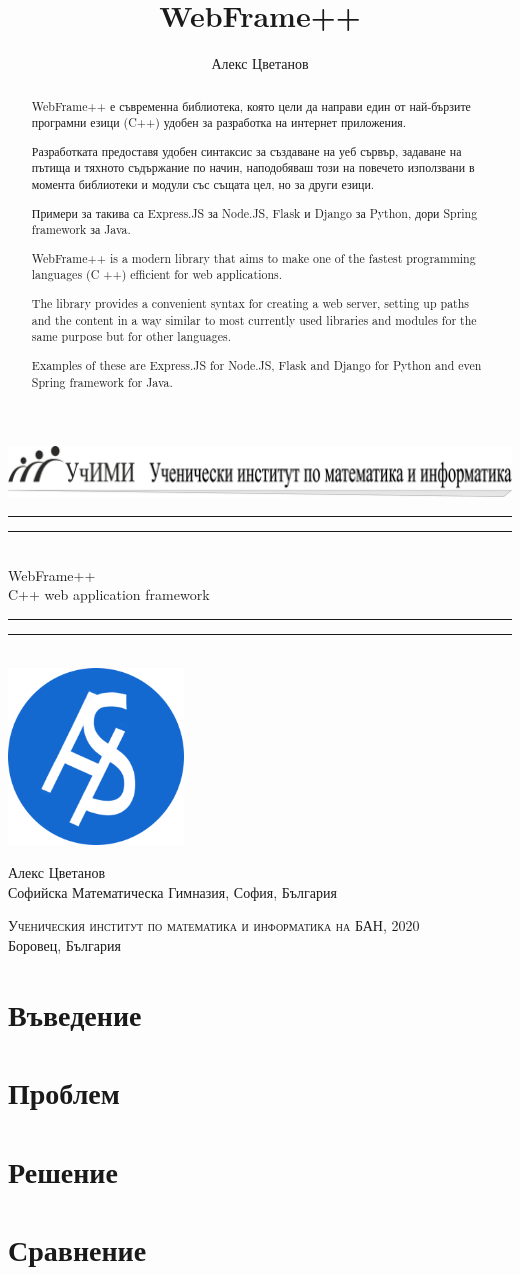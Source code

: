 \documentclass[a4paper,12pt]{article}
\title{WebFrame++}
\author{Алекс Цветанов}
\newcommand{\titleGP}{\begingroup
	\centering
		\includegraphics[width=\textwidth]{images/logo.png}
    \\\vspace{0.1cm}
	\rule{\textwidth}{1.6pt}\vspace{-\baselineskip}\vspace{2pt}
	\rule{\textwidth}{0.4pt}\\[\baselineskip]
	
	{\LARGE WebFrame++ \\ \small{C++ web application framework}}\\[0.2\baselineskip]
	
	\rule{\textwidth}{0.4pt}\vspace{-\baselineskip}\vspace{3.2pt}
	\rule{\textwidth}{1.6pt}\\[\baselineskip]
    \includegraphics[width=0.35\textwidth]{images/webpp-logo.png}

	\vspace{20pt}
	{
	{\LARGE Алекс Цветанов}\\
    {\normalsize Софийска Математическа Гимназия, София, България}
	\par}
	
	\vspace{2\baselineskip}
	
	\vfill
	
	{\scshape Ученическия институт по математика и информатика на БАН, 2020} \\[0.3\baselineskip]
	{\large Боровец, България}\par
	
	\endgroup}
\begin{document}
	
	\titleGP
	\newpage
	
	\tableofcontents
	\newpage
	
	\begin{abstract}
    \begin{text}
    \par
    WebFrame++ е съвременна библиотека, която цели да направи един от най-бързите програмни езици (C++) удобен за разработка на интернет приложения.\par
    Разработката предоставя удобен синтаксис за създаване на уеб сървър, задаване на пътища и тяхното съдържание по начин, наподобяваш този на повечето използвани в момента библиотеки и модули със същата цел, но за други езици.\par
    Примери за такива са Express.JS за Node.JS, Flask и Django за Python, дори Spring framework за Java.\par
    \vspace{1cm}
    WebFrame++ is a modern library that aims to make
one of the fastest programming languages (C ++) efficient for web applications. \par
The library provides a convenient syntax for creating a web server, setting up paths and the content in a way similar to most currently used libraries and
modules for the same purpose but for other languages.\par
Examples of these are Express.JS for Node.JS, Flask and Django for
Python and even Spring framework for Java.\par



    \end{text}
	\end{abstract}
	\newpage
	
	\section{Въведение}
	    
	\section{Проблем}
	    
	\section{Решение}
	    
	\section{Сравнение} \label{compare}
	    
\end{document}
